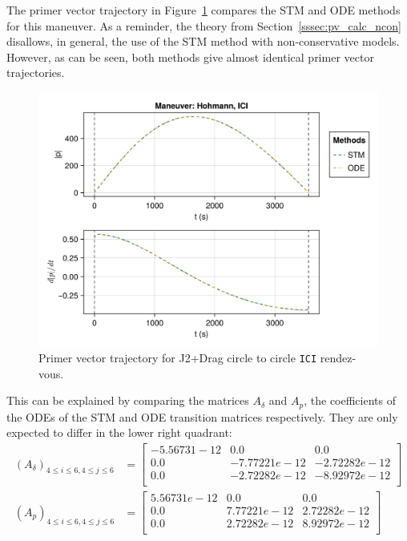 The primer vector trajectory in Figure~\ref{fig:jd_c2c_ICI_pv} compares the STM and ODE methods for this maneuver. As a reminder, the theory from Section~\ref{sssec:pv_calc_ncon} disallows, in general, the use of the STM method with non-conservative models. However, as can be seen, both methods give almost identical primer vector trajectories.

\begin{figure}[htbp]
    \centering
    \includegraphics[width=\textwidth]{../results/j2drag/hohmann/ICI_primer_vector.png}
    \caption{Primer vector trajectory for J2+Drag circle to circle \texttt{ICI} rendez-vous.}
    \label{fig:jd_c2c_ICI_pv}
\end{figure}

This can be explained by comparing the matrices \(A_\delta\) and \(A_p\), the coefficients of the ODEs of the STM and ODE transition matrices respectively. They are only expected to differ in the lower right quadrant:
\begin{align}
    (A_\delta)_{4\leq i \leq 6, 4 \leq j \leq 6} &= \begin{bmatrix}
        -5.56731-12 & 0.0 & 0.0 \\
        0.0 & -7.77221e-12    & -2.72282e-12 \\
        0.0 & -2.72282e-12    & -8.92972e-12 \\
    \end{bmatrix} \\
    (A_p)_{4\leq i \leq 6, 4 \leq j \leq 6} &= \begin{bmatrix}
        5.56731e-12 & 0.0 & 0.0 \\
        0.0 & 7.77221e-12 & 2.72282e-12 \\
        0.0 & 2.72282e-12 & 8.92972e-12 \\
    \end{bmatrix}
\end{align}

